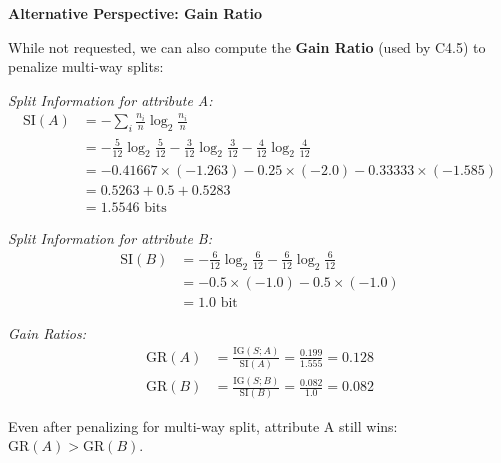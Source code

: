\documentclass[12pt]{article}
\begin{document}
\begin{solution}
\textbf{Alternative Perspective: Gain Ratio}

While not requested, we can also compute the \textbf{Gain Ratio} (used by C4.5) to penalize multi-way splits:

\textit{Split Information for attribute A:}
\begin{align*}
\text{SI}(A) &= -\sum_i \frac{n_i}{n} \log_2 \frac{n_i}{n} \\
&= -\frac{5}{12}\log_2\frac{5}{12} - \frac{3}{12}\log_2\frac{3}{12} - \frac{4}{12}\log_2\frac{4}{12} \\
&= -0.41667 \times (-1.263) - 0.25 \times (-2.0) - 0.33333 \times (-1.585) \\
&= 0.5263 + 0.5 + 0.5283 \\
&= 1.5546 \text{ bits}
\end{align*}

\textit{Split Information for attribute B:}
\begin{align*}
\text{SI}(B) &= -\frac{6}{12}\log_2\frac{6}{12} - \frac{6}{12}\log_2\frac{6}{12} \\
&= -0.5 \times (-1.0) - 0.5 \times (-1.0) \\
&= 1.0 \text{ bit}
\end{align*}

\textit{Gain Ratios:}
\begin{align*}
\text{GR}(A) &= \frac{\text{IG}(S; A)}{\text{SI}(A)} = \frac{0.199}{1.555} = 0.128 \\
\text{GR}(B) &= \frac{\text{IG}(S; B)}{\text{SI}(B)} = \frac{0.082}{1.0} = 0.082
\end{align*}

Even after penalizing for multi-way split, attribute A still wins: $\text{GR}(A) > \text{GR}(B)$.
\end{solution}
\end{document}
